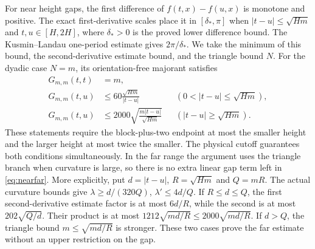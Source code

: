 \documentclass[11pt,a4paper]{article}
\numberwithin{equation}{section}
\theoremstyle{definition}
\begin{document}
For near height gaps, the first difference of $f(t,x)-f(u,x)$ is monotone
and positive. The exact first-derivative scales place it in
$[\delta_*,\pi]$ when $|t-u|\le\sqrt{Hm}$ and $t,u\in[H,2H]$,
where $\delta_*>0$ is the proved lower difference bound. The Kusmin--Landau
one-period estimate gives $2\pi/\delta_*$. We take the minimum of
this bound, the second-derivative estimate bound, and the triangle bound $N$. For the dyadic
case $N=m$, its orientation-free majorant satisfies
\begin{align}\label{eq:nearfar}
 G_{m,m}(t,t)&=m,\\
 G_{m,m}(t,u)&\le60\frac{\sqrt{Hm}}{|t-u|}
                  &&(0<|t-u|\le\sqrt{Hm}),\nonumber\\
 G_{m,m}(t,u)&\le2000\sqrt{\frac{m|t-u|}{\sqrt{Hm}}}
                  &&(|t-u|\ge\sqrt{Hm}).\nonumber
\end{align}
These statements require the block-plus-two endpoint at most the smaller
height and the larger height at most twice the smaller. The physical
cutoff guarantees both conditions simultaneously. In the far range the argument
uses the triangle branch when curvature is large, so there is no extra linear
gap term left in \eqref{eq:nearfar}. More explicitly, put
$d=|t-u|$, $R=\sqrt{Hm}$ and $Q=mR$.
The actual curvature bounds give $\lambda\ge d/(320Q)$,
$\lambda'\le4d/Q$. If $R\le d\le Q$, the first second-derivative estimate factor is
at most $6d/R$, while the second is at most $202\sqrt{Q/d}$.
Their product is at most $1212\sqrt{md/R}\le2000\sqrt{md/R}$.
If $d>Q$, the triangle bound $m\le\sqrt{md/R}$ is stronger.
These two cases prove the far estimate without an upper restriction on the gap.
\end{document}
